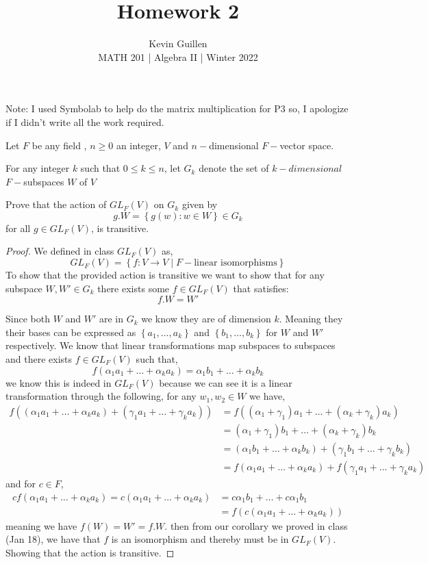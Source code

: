 \documentclass[11pt]{article}
\newenvironment{problem}[2][Problem\!]{\begin{trivlist}
\item[\hskip \labelsep {\bfseries #1}\hskip \labelsep {\bfseries #2}]}{\end{trivlist}}
\newcommand{\set}[1]{\left\{#1\right\}} %
\renewcommand{\geq}{\geqslant}
\renewcommand{\leq}{\leqslant}
\begin{document}
 
\title{Homework 2}
\author{Kevin Guillen\\[0.5em]
MATH 201  | Algebra II | Winter 2022}
\date{} 
\maketitle

Note: I used Symbolab to help do the matrix multiplication for P3 so, I apologize if I didn't write all the work required. 
\begin{tcolorbox}
  \begin{problem} {P1}
    Let $F$ be any field , $n \geq 0 $ an integer, $V$ and $n-$dimensional $F-$vector space.

    For any integer $k$ such that $0 \leq k \leq n$, let $G_k$ denote the set of $k-dimensional$ $F-$subspaces $W$ of $V$

    Prove that the action of $GL_F(V)$ on $G_k$ given by
    \[g.W = \set{g(w): w \in W} \in G_k\]
    for all $g \in GL_F(V)$, is transitive.
  \end{problem}
\end{tcolorbox}

\begin{proof}
  We defined in class $GL_F(V)$ as,
  \[GL_F(V) = \set{f: V \rightarrow V \mid F-\text{linear isomorphisms}}\]
  To show that the provided action is transitive we want to show that for any subspace $W,W' \in G_k$ there exists some $f \in GL_F(V)$ that satisfies:
  \[f.W = W'\]

  Since both $W$ and $W'$ are in $G_k$ we know they are of dimension $k$. Meaning they their bases can be expressed as $\set{a_1, \dots , a_k}$ and $\set{b_1, \dots ,b_k}$ for $W$ and $W'$ respectively. We know that linear transformations map subspaces to subspaces and there exists $f\in GL_F(V)$ such that,
  \[f(\alpha_1a_1 + \dots + \alpha_ka_k) = \alpha_1b_1 + \dots +\alpha_kb_k\]
  we know this is indeed in $GL_F(V)$ because we can see it is a linear transformation through the following, for any $w_1,w_2 \in W $ we have,
 \begin{align*}
  f((\alpha_1a_1 + \dots + \alpha_ka_k) + (\gamma_1a_1 + \dots + \gamma_ka_k )) &= f((\alpha_1 + \gamma_1)a_1 + \dots + (\alpha_k + \gamma_k)a_k) \\
  &= (\alpha_1 + \gamma_1)b_1 + \dots + (\alpha_k + \gamma_k)b_k \\
  &=(\alpha_1b_1 + \dots + \alpha_kb_k) + (\gamma_1b_1 + \dots + \gamma_kb_k ) \\
  &= f(\alpha_1a_1 + \dots + \alpha_ka_k) + f(\gamma_1a_1 + \dots + \gamma_ka_k)
 \end{align*}
 and for $c \in F$,
 \begin{align*}
   cf(\alpha_1a_1 + \dots + \alpha_ka_k) = c(\alpha_1a_1 + \dots + \alpha_ka_k) &= c\alpha_1b_1 + \dots + c\alpha_1b_1 \\
   &= f(c(\alpha_1a_1 + \dots + \alpha_ka_k))
 \end{align*}
 meaning we have $f(W) = W' = f.W$.
 then from our corollary we proved in class (Jan 18), we have that $f$ is an isomorphism and thereby must be in $GL_F(V)$. Showing that the action is transitive.
\end{proof}
\end{document}
